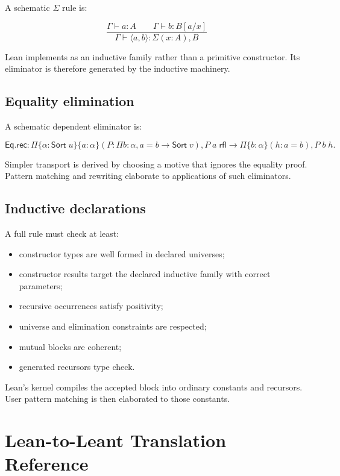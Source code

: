 \documentclass[10pt,letterpaper,oneside,openany]{report}
\newcommand{\term}[1]{\texttt{\detokenize{#1}}}
\begin{document}
A schematic $\Sigma$ rule is:

\begin{formalbox}
\[
\frac{\Gamma\vdash a:A\qquad \Gamma\vdash b:B[a/x]}
     {\Gamma\vdash \langle a,b\rangle : \Sigma(x:A),B}
\]
\end{formalbox}

Lean implements \term{Sigma} as an inductive family rather than a primitive \term{Expr} constructor.  Its eliminator is therefore generated by the inductive machinery.

\section{Equality elimination}

A schematic dependent eliminator is:

\[
\mathsf{Eq.rec} :
\Pi\{\alpha:\mathsf{Sort}\;u\}\{a:\alpha\}
(P:\Pi b:\alpha, a=b\to\mathsf{Sort}\;v),
P\;a\;\mathsf{rfl}\to
\Pi\{b:\alpha\}(h:a=b),P\;b\;h.
\]

Simpler transport is derived by choosing a motive that ignores the equality proof.  Pattern matching and rewriting elaborate to applications of such eliminators.

\section{Inductive declarations}

A full rule must check at least:

\begin{itemize}
\item constructor types are well formed in declared universes;
\item constructor results target the declared inductive family with correct parameters;
\item recursive occurrences satisfy positivity;
\item universe and elimination constraints are respected;
\item mutual blocks are coherent;
\item generated recursors type check.
\end{itemize}

Lean's kernel compiles the accepted block into ordinary constants and recursors.  User pattern matching is then elaborated to those constants.

\chapter{Lean-to-Leant Translation Reference}\label{app:mapping}
\end{document}
